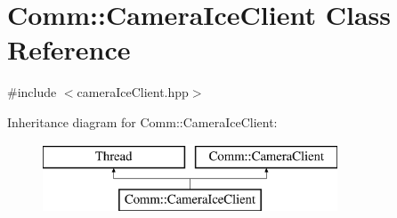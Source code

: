 \hypertarget{class_comm_1_1_camera_ice_client}{}\section{Comm\+:\+:Camera\+Ice\+Client Class Reference}
\label{class_comm_1_1_camera_ice_client}


{\ttfamily \#include $<$camera\+Ice\+Client.\+hpp$>$}

Inheritance diagram for Comm\+:\+:Camera\+Ice\+Client\+:\begin{figure}[H]
\begin{center}
\leavevmode
\includegraphics[height=2.000000cm]{class_comm_1_1_camera_ice_client}
\end{center}
\end{figure}
